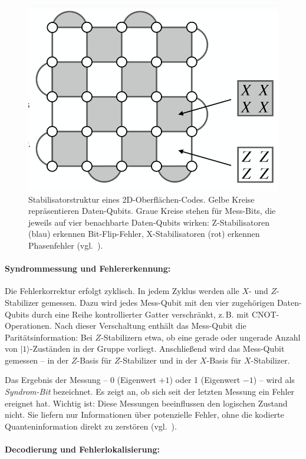 \begin{figure}[H]
    \centering
    \includegraphics[width=0.6\linewidth]{images/error-correction/Abb4_Oberflaechencode_1.png}
    \caption{Stabilisatorstruktur eines 2D-Oberflächen-Codes. Gelbe Kreise repräsentieren Daten-Qubits. Graue Kreise stehen für Mess-Bits, die jeweils auf vier benachbarte Daten-Qubits wirken: Z-Stabilisatoren (blau) erkennen Bit-Flip-Fehler, X-Stabilisatoren (rot) erkennen Phasenfehler (vgl.~\cite{higgott_improved_2023}).}
    \label{fig:oberflaechencode-stabilisatoren}
\end{figure}

\paragraph{Syndrommessung und Fehlererkennung:}

Die Fehlerkorrektur erfolgt zyklisch. In jedem Zyklus werden alle \(X\)- und \(Z\)-Stabilizer gemessen. Dazu wird jedes Mess-Qubit mit den vier zugehörigen Daten-Qubits durch eine Reihe kontrollierter Gatter verschränkt, z.\,B. mit CNOT-Operationen. Nach dieser Verschaltung enthält das Mess-Qubit die Paritätsinformation: Bei \(Z\)-Stabilizern etwa, ob eine gerade oder ungerade Anzahl von \( |1\rangle \)-Zuständen in der Gruppe vorliegt. Anschließend wird das Mess-Qubit gemessen – in der \(Z\)-Basis für \(Z\)-Stabilizer und in der \(X\)-Basis für \(X\)-Stabilizer.

Das Ergebnis der Messung – 0 (Eigenwert \(+1\)) oder 1 (Eigenwert \(-1\)) – wird als \emph{Syndrom-Bit} bezeichnet. Es zeigt an, ob sich seit der letzten Messung ein Fehler ereignet hat. Wichtig ist: Diese Messungen beeinflussen den logischen Zustand nicht. Sie liefern nur Informationen über potenzielle Fehler, ohne die kodierte Quanteninformation direkt zu zerstören (vgl.~\cite[5-6]{fowler_surface_2012}).

\paragraph{Decodierung und Fehlerlokalisierung:}

